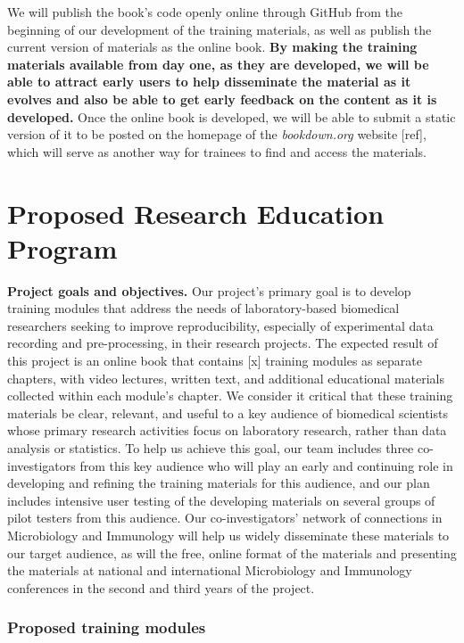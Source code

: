 \documentclass[pdftex,english,11pt,parskip=half]{scrartcl}
\begin{document}
We will publish the book's code openly online through GitHub from the beginning
of our development of the training materials, as well as publish the current
version of materials as the online book. \textbf{By making the training
materials available from day one, as they are developed, we will be able to
attract early users to help disseminate the material as it evolves and also be
able to get early feedback on the content as it is developed.} Once the online
book is developed, we will be able to submit a static version of it to be posted
on the homepage of the \textit{bookdown.org} website [ref], which will serve as
another way for trainees to find and access the materials.

\section{Proposed Research Education Program}

\textbf{Project goals and objectives.} Our project's primary goal is to develop
training modules that address the needs of laboratory-based biomedical
researchers seeking to improve reproducibility, especially of experimental data
recording and pre-processing, in their research projects. The expected result of
this project is an online book that contains [x] training modules as separate
chapters, with video lectures, written text, and additional educational
materials collected within each module's chapter. We consider it critical that
these training materials be clear, relevant, and useful to a key audience of
biomedical scientists whose primary research activities focus on laboratory
research, rather than data analysis or statistics. To help us achieve this goal,
our team includes three co-investigators from this key audience who will play an
early and continuing role in developing and refining the training materials for
this audience, and our plan includes intensive user testing of the developing
materials on several groups of pilot testers from this audience. Our
co-investigators' network of connections in Microbiology and Immunology will
help us widely disseminate these materials to our target audience, as will the
free, online format of the materials and presenting the materials at national
and international Microbiology and Immunology conferences in the second and
third years of the project.

\subsubsection*{Proposed training modules}
\end{document}
